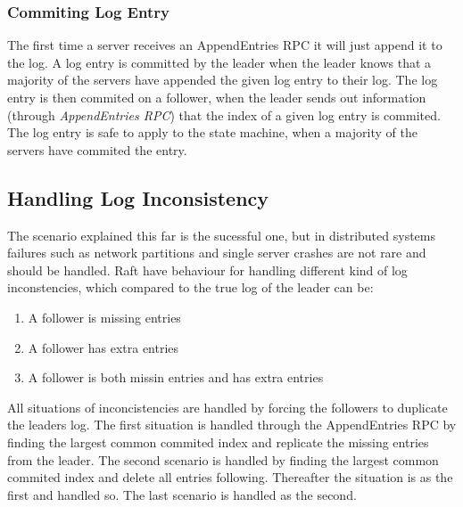 
\subsubsection{Commiting Log Entry} %
\label{ssub:commiting_log_entry}

The first time a server receives an AppendEntries RPC it will just append it to the log. A log entry is committed by the leader when the leader knows that a majority of the servers have appended the given log entry to their log. The log entry is then commited on a follower, when the leader sends out information (through \emph{AppendEntries RPC}) that the index of a given log entry is commited. The log entry is safe to apply to the state machine, when a majority of the servers have commited the entry.


\subsection{Handling Log Inconsistency} %
\label{sub:handling_log_inconsistency}

The scenario explained this far is the sucessful one, but in distributed systems failures such as network partitions and single server crashes are not rare and should be handled. Raft have behaviour for handling different kind of log inconstencies, which compared to the true log of the leader can be:

\begin{enumerate}
  \item A follower is missing entries
  \item A follower has extra entries
  \item A follower is both missin entries and has extra entries
\end{enumerate}

All situations of inconcistencies are handled by forcing the followers to duplicate the leaders log. The first situation is handled through the AppendEntries RPC by finding the largest common commited index and replicate the missing entries from the leader. The second scenario is handled by finding the largest common commited index and delete all entries following. Thereafter the situation is as the first and handled so. The last scenario is handled as the second.


